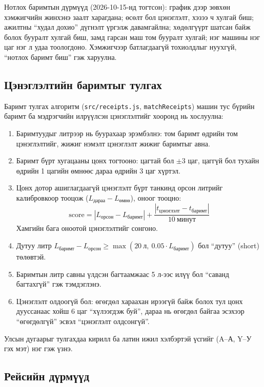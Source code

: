 \documentclass[
12pt,
oneside,
english,
onehalfspacing,
nolistspacing,
headsepline,
]{MUST-Thesis}
\begin{document}
Нотлох баримтын дүрмүүд (2026-10-15-нд тогтсон): график дээр зөвхөн хэмжигчийн жинхэнэ заалт харагдана; өсөлт бол цэнэглэлт, хэзээ ч хулгай биш; ажилтны ``худал дохио'' дүгнэлт үргэлж давамгайлна; хөдөлгүүрт шатсан байж болох бууралт хулгай биш, замд гарсан маш том бууралт хулгай; нэг машины нэг цаг нэг л удаа тоологдоно. Хэмжигчээр батлагдаагүй тохиолдлыг нуухгүй, ``нотлох баримт биш'' гэж харуулна.

\subsection{Цэнэглэлтийн баримтыг тулгах}

Баримт тулгах алгоритм (\texttt{src/receipts.js}, \texttt{matchReceipts}) машин тус бүрийн баримт ба мэдрэгчийн илрүүлсэн цэнэглэлтийг хооронд нь хослуулна:

\begin{enumerate}
    \item Баримтуудыг литрээр нь буурахаар эрэмбэлнэ: том баримт өдрийн том цэнэглэлтийг, жижиг нэмэлт цэнэглэлт жижиг баримтыг авна.
    \item Баримт бүрт хугацааны цонх тогтооно: цагтай бол $\pm3$ цаг, цаггүй бол тухайн өдрийн 1 цагийн өмнөөс дараа өдрийн 3 цаг хүртэл.
    \item Цонх дотор ашиглагдаагүй цэнэглэлт бүрт танкинд орсон литрийг калибровкоор тооцож ($L_{\text{дараа}} - L_{\text{өмнө}}$), оноог тооцно:
    \begin{equation}
    \text{score} = \left|L_{\text{орсон}} - L_{\text{баримт}}\right| + \frac{|t_{\text{цэнэглэлт}} - t_{\text{баримт}}|}{10\ \text{минут}}
    \end{equation}
    Хамгийн бага оноотой цэнэглэлтийг сонгоно.
    \item Дутуу литр $L_{\text{баримт}} - L_{\text{орсон}} \geq \max(20\ \text{л},\ 0.05\cdot L_{\text{баримт}})$ бол ``дутуу'' (short) төлөвтэй.
    \item Баримтын литр савны үлдсэн багтаамжаас 5 л-ээс илүү бол ``саванд багтахгүй'' гэж тэмдэглэнэ.
    \item Цэнэглэлт олдоогүй бол: өгөгдөл хараахан ирээгүй байж болох тул цонх дууссанаас хойш 6 цаг ``хүлээгдэж буй'', дараа нь өгөгдөл байгаа эсэхээр ``өгөгдөлгүй'' эсвэл ``цэнэглэлт олдсонгүй''.
\end{enumerate}
Улсын дугаарыг тулгахдаа кирилл ба латин ижил хэлбэртэй үсгийг (A--А, Y--У гэх мэт) нэг гэж үзнэ.

\subsection{Рейсийн дүрмүүд}
\end{document}
